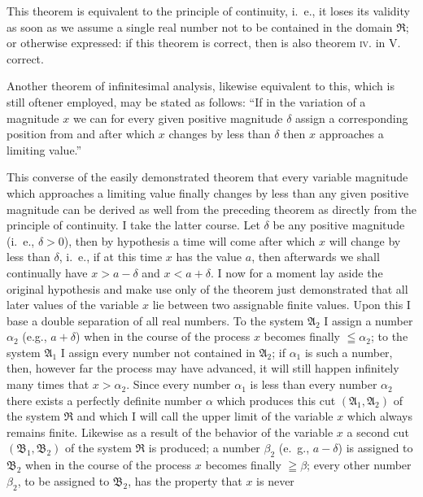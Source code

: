 \documentclass[oneside]{book}
\begin{document}
This theorem is equivalent to the principle of continuity,
i.~e., it loses its validity as soon as we assume
a single real number not to be contained in the domain
$\mathfrak{R}$; or otherwise expressed: if this theorem is
correct, then is also theorem \textsc{iv}. in V. correct.

Another theorem of infinitesimal analysis, likewise
equivalent to this, which is still oftener employed,
may be stated as follows: ``If in the variation of a
magnitude $x$ we can for every given positive magnitude
$\delta$ assign a corresponding position from and after
which $x$ changes by less than $\delta$ then $x$ approaches a
limiting value.''

This converse of the easily demonstrated theorem
that every variable magnitude which approaches a
limiting value finally changes by less than any given
positive magnitude can be derived as well from the
preceding theorem as directly from the principle of
continuity.  I take the latter course.  Let $\delta$ be any
positive magnitude (i.~e., $\delta>0$), then by hypothesis
a time will come after which $x$ will change by less
than $\delta$, i.~e., if at this time $x$ has the value $a$, then
afterwards we shall continually have $x>a-\delta$ and
$x<a+\delta$.  I now for a moment lay aside the original
hypothesis and make use only of the theorem just
demonstrated that all later values of the variable $x$ lie
between two assignable finite values. Upon this I base
a double separation of all real numbers.  To the system
$\mathfrak{A}_2$ I assign a number $\alpha_2$ (e.g., $a+\delta$) when in the
course of the process $x$ becomes finally $\leqq \alpha_2$; to the
system $\mathfrak{A}_1$ I assign every number not contained in $\mathfrak{A}_2$;
if $\alpha_1$ is such a number, then, however far the process
may have advanced, it will still happen infinitely many
times that $x>\alpha_2$.  Since every number $\alpha_1$ is less than
every number $\alpha_2$ there exists a perfectly definite number
$\alpha$ which produces this cut $(\mathfrak{A}_1, \mathfrak{A}_2)$ of the system
$\mathfrak{R}$ and which I will call the upper limit of the variable
$x$ which always remains finite.  Likewise as a result
of the behavior of the variable $x$ a second cut $(\mathfrak{B}_1,
\mathfrak{B}_2)$ of the system $\mathfrak{R}$ is produced; a number $\beta_2$ (e.~g.,
$a-\delta$) is assigned to $\mathfrak{B}_2$ when in the course of the process
$x$ becomes finally $\geqq\beta$; every other number $\beta_2$,
to be assigned to $\mathfrak{B}_2$, has the property that $x$ is never
\end{document}
